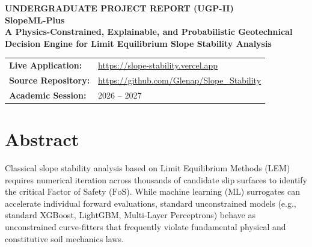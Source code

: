 \documentclass[12pt,a4paper,oneside]{report}
\begin{document}
\begin{titlepage}
  \centering
  \vspace*{1.5cm}
  
  {\Large\textbf{UNDERGRADUATE PROJECT REPORT (UGP-II)}}\\[2.0cm]
  
  {\Huge\textbf{\color{blue!85!black}SlopeML-Plus}}\\[0.8cm]
  {\Large\textbf{A Physics-Constrained, Explainable, and Probabilistic Geotechnical Decision Engine for Limit Equilibrium Slope Stability Analysis}}\\[2.5cm]
  
  \vfill
  
  \begin{tabular}{ll}
    \textbf{Live Application:} & \url{https://slope-stability.vercel.app} \\
    \textbf{Source Repository:} & \url{https://github.com/Glenap/Slope_Stability} \\
    \textbf{Academic Session:} & 2026 -- 2027
  \end{tabular}
  
  \vspace{1.0cm}
\end{titlepage}

\chapter*{Abstract}

Classical slope stability analysis based on Limit Equilibrium Methods (LEM) requires numerical iteration across thousands of candidate slip surfaces to identify the critical Factor of Safety ($\text{FoS}$). While machine learning (ML) surrogates can accelerate individual forward evaluations, standard unconstrained models (e.g., standard XGBoost, LightGBM, Multi-Layer Perceptrons) behave as unconstrained curve-fitters that frequently violate fundamental physical and constitutive soil mechanics laws. 
\end{document}
